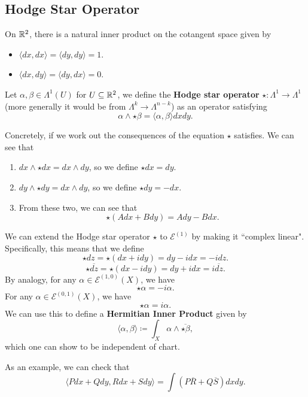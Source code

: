 \documentclass{article}
\begin{document}
{\subsection{Hodge Star Operator}

\begin{definition}
  On $\mathbb{R}^2$, there is a natural inner product on the cotangent space given by
  \begin{itemize}
      \item $\langle dx, dx \rangle = \langle dy, dy \rangle = 1$.
      \item $\langle dx, dy \rangle = \langle dy, dx \rangle = 0$.
  \end{itemize}
  Let $\alpha, \beta \in \Lambda^1(U)$ for $U \subseteq \mathbb{R}^2$, we define the \textbf{Hodge star operator} $\star: \Lambda^1 \to \Lambda^{1}$ (more generally it would be from $\Lambda^k \to \Lambda^{n-k}$) as an operator satisfying
  \[\alpha \wedge \star \beta = \langle \alpha, \beta \rangle dx dy.\]
\end{definition}

Concretely, if we work out the consequences of the equation $\star$ satisfies. We can see that
\begin{enumerate}
    \item $dx \wedge \star dx = dx \wedge dy$, so we define $\star dx = dy$.
    \item $dy \wedge \star dy = dx \wedge dy$, so we define $\star dy = -dx$.
    \item From these two, we can see that
    \[\star (A dx + B dy) = A dy - B dx.\]
\end{enumerate}

\begin{definition}
    We can extend the Hodge star operator $\star$ to $\mathcal{E}^{(1)}$ by making it ``complex linear". Specifically, this means that we define
    \[\star dz = \star (dx + idy) = dy - i dx = - i dz. \]
    \[\star \overline{dz} = \star (dx - idy) = dy + idx = i \overline{dz}.\]
    By analogy, for any $\alpha \in \mathcal{E}^{(1, 0)}(X)$, we have
    \[\star \alpha = -i \alpha.\]
    For any $\alpha \in \mathcal{E}^{(0, 1)}(X)$, we have
    \[\star \alpha = i \alpha.\]
    We can use this to define a \textbf{Hermitian Inner Product} given by
    \[\langle \alpha, \beta \rangle \coloneqq \int_X \alpha \wedge \overline{\star \beta},\]
    which one can show to be independent of chart.
\end{definition}

As an example, we can check that
\[\langle P dx + Q dy, R dx + S dy \rangle = \int (P \overline{R} + Q \overline{S}) dx dy.\]

}
\end{document}

